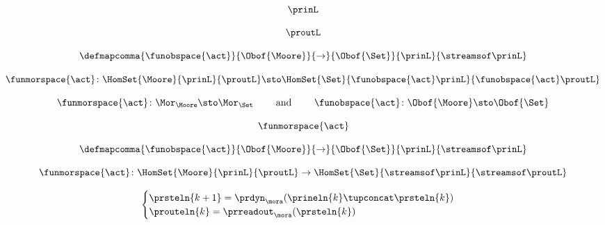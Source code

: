 \begin{forslides}
    \begin{equation}
        \label{eq:slides-processes-36}
        \prinL
    \end{equation}

    \begin{equation}
        \label{eq:slides-processes-37}
        \proutL
    \end{equation}

    \begin{equation}
        \label{eq:slides-processes-38}
        \defmapcomma{\funobspace{\act}}
    {\Obof{\Moore}}
    {\to}
    {\Obof{\Set}}
    {\prinL}
    {\streamsof\prinL}
    \end{equation}

    \begin{equation}
        \label{eq:slides-processes-39}
        \funmorspace{\act} \colon  \HomSet{\Moore}{\prinL}{\proutL} \sto \HomSet{\Set}{ \funobspace{\act}\prinL}{\funobspace{\act}\proutL}
    \end{equation}
    
    \begin{equation}
        \label{eq:slides-processes-40}
        \funmorspace{\act} \colon \Mor_\Moore \sto \Mor_\Set \qquad \text{ and } \qquad \funobspace{\act} \colon \Obof{\Moore} \sto \Obof{\Set}
    \end{equation}

    \begin{equation}
        \label{eq:slides-processes-41}
        \funmorspace{\act}
    \end{equation}

    \begin{equation}
        \label{eq:slides-processes-42}
        \defmapcomma{\funobspace{\act}}
        {\Obof{\Moore}}
        {\to}
        {\Obof{\Set}}
        {\prinL}
        {\streamsof\prinL}
    \end{equation}

    \begin{equation}
        \label{eq:slides-processes-43}
         \funmorspace{\act} \colon  \HomSet{\Moore}{\prinL}{\proutL} \to \HomSet{\Set}{\streamsof\prinL }{\streamsof\proutL}
    \end{equation}

    \begin{equation}
        \label{eq:slides-processes-44}
        \begin{cases}
            \prsteln{k+1} = \prdyn_\mora(\prineln{k} \tupconcat \prsteln{k}) \\
            \prouteln{k}   = \prreadout_\mora(\prsteln{k})
        \end{cases}
    \end{equation}


\end{forslides}
